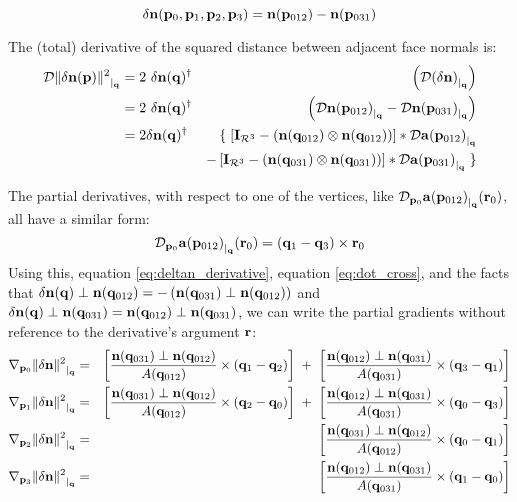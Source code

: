 \begin{equation}
\label{eq:deltan}
{\mathbf \dn} (\p_0, \p_1, \p_2, \p_3)
=
\n (\p_{012}) - \n (\p_{031})
\end{equation}

The (total) derivative of the squared distance between adjacent face normals is:
\begin{eqnarray}
\Db{\|\dn(\p)\|^2}{\q}
& =
2 \ \dn ( \q )^\dagger &
\left( \Db{ ( \dn ) }{\q} \right)
\\
& =
2 \ \dn(\q)^\dagger &
\left( \Db{\n(\p_{012})}{\q} - \Db{\n(\p_{031})}{\q} \right)
\nonumber \\
& =
2 \dn(\q)^\dagger &
\{ \; \left[ \I_{\Re^3} - \left( \n( \q_{012} ) \otimes \n( \q_{012} ) \right)
\right]
\ast \Db{\a ( \p_{012} ) }{\q}
\nonumber \\
\label{eq:deltan_derivative}
&
& - \left[ \I_{\Re^3} - \left( \n( \q_{031} ) \otimes \n ( \q_{031} ) \right)
\right]
\ast \Db{\a ( \p_{031} ) }{\q}
\; \}
\nonumber
\end{eqnarray}

The partial derivatives, with respect to one of the vertices,
like ${\mathcal{D}_{{\mathbf p}_0}{{{\mathbf a} ( {\mathbf p}_{012} ) }}_{\mid_{{\mathbf q}}}({{{\mathbf r}_0}})}$,
all have a similar form:
\begin{equation}
{\mathcal{D}_{{\mathbf p}_0}{{{\mathbf a}( {\mathbf p}_{012} ) }}_{\mid_{{\mathbf q}}}({{{\mathbf r}_0}})}  = ({\mathbf q}_1 - {\mathbf q}_3) \times {\mathbf r}_0
\end{equation}
Using this, equation \ref{eq:deltan_derivative}, equation \ref{eq:dot_cross},
and the facts that
${\mathbf \delta {\mathbf n}}({\mathbf q})  \perp  {\mathbf n}({\mathbf q}_{012}) = - \left( {\mathbf n}({\mathbf q}_{031})  \perp  {\mathbf n}({\mathbf q}_{012}) \right)$
and
${\mathbf \delta {\mathbf n}}({\mathbf q})  \perp  {\mathbf n}({\mathbf q}_{031}) = {\mathbf n}({\mathbf q}_{012})  \perp  {\mathbf n}({\mathbf q}_{031})$,
we can write the partial gradients without reference to the
derivative's argument ${\mathbf r}$:
\begin{eqnarray}
\label{eq:normal-difference-gradient}
\Gc{\p_0}{\|\dn\|^2}{\q}
& = &
\left[
{{ \n(\q_{031})  \perp  \n(\q_{012}) }
\over {A(\q_{012})}}
\times (\q_1 - \q_2)
\right]
\; + \;
\left[
{{ \n(\q_{012})  \perp  \n(\q_{031}) }
\over {A(\q_{031})}}
\times (\q_3 - \q_1)
\right]
\\
\Gc{\p_1}{\|\dn\|^2}{\q}
& = &
\left[
{{ \n(\q_{031})  \perp  \n(\q_{012}) }
\over {A(\q_{012})}}
\times (\q_2 - \q_0)
\right]
\; + \;
\left[
{{ \n(\q_{012})  \perp  \n(\q_{031}) }
\over {A(\q_{031})}}
\times (\q_0 - \q_3)
\right]
\nonumber
\\
\Gc{\p_2}{\|\dn\|^2}{\q}
& = &
\left[
{{ \n(\q_{031})  \perp  \n(\q_{012}) }
\over {A(\q_{012})}}
\times (\q_0 - \q_1)
\right]
\nonumber
\\
\Gc{\p_3}{\|\dn\|^2}{\q}
& = &
\left[
{{ \n(\q_{012})  \perp  \n(\q_{031}) }
\over {A(\q_{031})}}
\times (\q_1 - \q_0)
\right]
\nonumber
\end{eqnarray}

